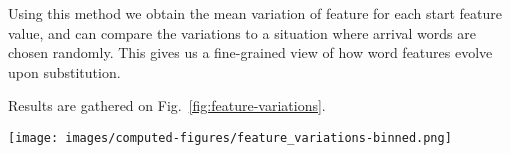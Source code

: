 Using this method we obtain the mean variation of feature for each start feature value, and can compare the variations to a situation where arrival words are chosen randomly.
This gives us a fine-grained view of how word features evolve upon substitution.


\medskip
Results are gathered on Fig.~\ref{fig:feature-variations}.


\begin{figure*}[!th]
    \centering
    \texttt{[image: images/computed-figures/feature\_variations-binned.png]}
    \caption{\textbf{Feature variation upon substitution:} average feature of the appearing word minus $\mathcal{H}_0$ vs. average feature of the disappearing word in a substitution, with 95\% asymptotic confidence intervals.
    The overall position of the curve with respect to $y = 0$ indicates the direction of the cognitive bias.
    The fact that all the curves have slopes smaller than 1 means that the substitution operation is contractile on average: each feature will converge towards its own specific asymptotic range, which is consistent with the evolution observed in Figure~\ref{fig:timebags-evolution}.}
    \label{fig:feature-variations}
\end{figure*}